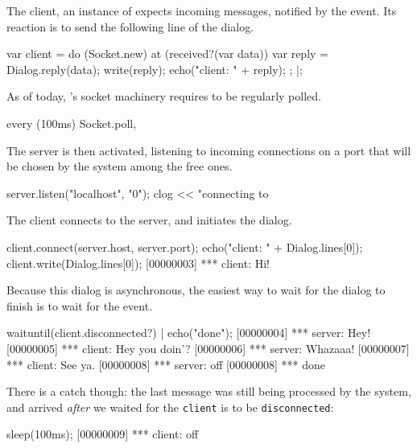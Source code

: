 The client, an instance of  expects incoming messages,
notified by the  event.  Its reaction is to send the
following line of the dialog.

\begin{urbiscript}
var client =
  do (Socket.new)
  {
    at (received?(var data))
    {
      var reply = Dialog.reply(data);
      write(reply);
      echo("client: " + reply);
    };
  }|;
\end{urbiscript}

As of today, \us's socket machinery requires to be regularly polled.

\begin{urbiscript}
every (100ms)
  Socket.poll,
\end{urbiscript}

The server is then activated, listening to incoming connections on a port
that will be chosen by the system among the free ones.

\begin{urbiscript}
server.listen("localhost", "0");
clog << "connecting to %
\end{urbiscript}

The client connects to the server, and initiates the dialog.

\begin{urbiscript}
client.connect(server.host, server.port);
echo("client: " + Dialog.lines[0]);
client.write(Dialog.lines[0]);
[00000003] *** client: Hi!
\end{urbiscript}

Because this dialog is asynchronous, the easiest way to wait for the dialog
to finish is to wait for the  event.

\begin{urbiscript}
waituntil(client.disconnected?) | echo("done");
[00000004] *** server: Hey!
[00000005] *** client: Hey you doin'?
[00000006] *** server: Whazaaa!
[00000007] *** client: See ya.
[00000008] *** server: off
[00000008] *** done
\end{urbiscript}

There is a catch though: the last message was still being processed by the
system, and arrived \emph{after} we waited for the \lstinline{client} is to
be \lstinline{disconnected}:

\begin{urbiscript}
sleep(100ms);
[00000009] *** client: off
\end{urbiscript}

